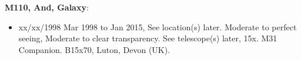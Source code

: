 {\bf M110, And, Galaxy}:
\begin{itemize}
\item xx/xx/1998 Mar 1998 to Jan 2015, See location(s) later. Moderate to perfect seeing, Moderate to clear transparency. See telescope(s) later, 15x. M31 Companion. B15x70, Luton, Devon (UK).
\end{itemize}
